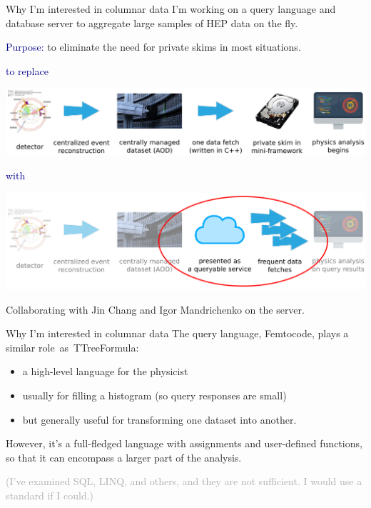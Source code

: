 \documentclass{beamer}
\begin{document}
\begin{frame}{Why I'm interested in columnar data}
\vspace{0.5 cm}
I'm working on a query language and database server to aggregate large samples of HEP data on the fly.

\vspace{0.3 cm}
\textcolor{darkblue}{Purpose:} to eliminate the need for private skims in most situations.

\vspace{0.3 cm}
\begin{center}
\large \textcolor{darkblue}{to replace}

\includegraphics[width=0.8\linewidth]{workflow.png}
\end{center}

\begin{center}
\large \textcolor{darkblue}{with}

\includegraphics[width=0.8\linewidth]{workflow2.png}
\end{center}

\scriptsize
\vspace{-0.2 cm}
Collaborating with Jin Chang and Igor Mandrichenko on the server.
\end{frame}

\begin{frame}{Why I'm interested in columnar data}
The query language, Femtocode, plays a similar \mbox{role as TTreeFormula:\hspace{-1 cm}}
\begin{itemize}
\item a high-level language for the physicist
\item usually for filling a histogram (so query responses are small)
\item but generally useful for transforming one dataset into another.
\end{itemize}

\vspace{0.3 cm}
However, it's a full-fledged language with assignments and user-defined functions, so that it can encompass a larger part of the analysis.

\vspace{0.3 cm}
\textcolor{darkgray}{(I've examined SQL, LINQ, and others, and they are not sufficient. I would use a standard if I could.)}
\end{frame}
\end{document}
